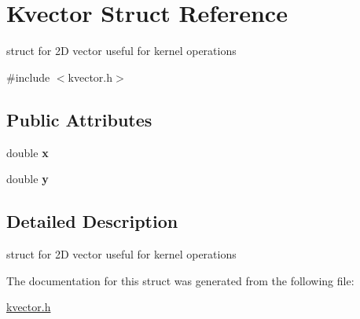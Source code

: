 \hypertarget{structKvector}{\section{\-Kvector \-Struct \-Reference}
\label{structKvector}
}


struct for 2\-D vector useful for kernel operations  




{\ttfamily \#include $<$kvector.\-h$>$}

\subsection*{\-Public \-Attributes}
\begin{DoxyCompactItemize}
\item 
\hypertarget{structKvector_ab60dcfd33341d908dcad2306bd11e3e3}{double {\bfseries x}}\label{structKvector_ab60dcfd33341d908dcad2306bd11e3e3}

\item 
\hypertarget{structKvector_a56d7ba00fc9d34e15f5c1e391bf466f4}{double {\bfseries y}}\label{structKvector_a56d7ba00fc9d34e15f5c1e391bf466f4}

\end{DoxyCompactItemize}


\subsection{\-Detailed \-Description}
struct for 2\-D vector useful for kernel operations 

\-The documentation for this struct was generated from the following file\-:\begin{DoxyCompactItemize}
\item 
\hyperlink{kvector_8h}{kvector.\-h}\end{DoxyCompactItemize}
